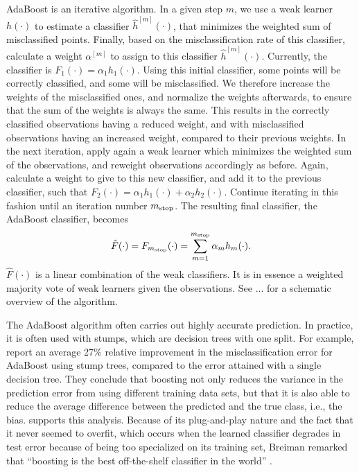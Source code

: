 AdaBoost is an iterative algorithm.
In a given step $m$, we use a weak learner $h(\cdot)$ to estimate a classifier $\hat{h}^{[m]}(\cdot)$, that minimizes the weighted sum of misclassified points.
Finally, based on the misclassification rate of this classifier, calculate a weight $\alpha^{[m]}$ to assign to this classifier $\hat{h}^{[m]}(\cdot)$.
Currently, the classifier is $F_1(\cdot)=\alpha_1h_1(\cdot)$.
Using this initial classifier, some points will be correctly classified, and some will be misclassified.
We therefore increase the weights of the misclassified ones, and normalize the weights afterwards, to ensure that the sum of the weights is always the same.
This results in the correctly classified observations having a reduced weight, and with misclassified observations having an increased weight, compared to their previous weights.
In the next iteration, apply again a weak learner which minimizes the weighted sum of the observations, and reweight observations accordingly as before.
Again, calculate a weight to give to this new classifier, and add it to the previous classifier, such that $F_2(\cdot)=\alpha_1h_1(\cdot)+\alpha_2h_2(\cdot)$.
Continue iterating in this fashion until an iteration number $m_{\text{stop}}$.
The resulting final classifier, the AdaBoost classifier, becomes
\begin{equation*}
    \hat{F}(\cdot)=F_{m_{\text{stop}}}(\cdot)=\sum_{m=1}^{m_{\text{stop}}}\alpha_mh_m(\cdot).
\end{equation*}
$\hat{F}(\cdot)$ is a linear combination of the weak classifiers.
It is in essence a weighted majority vote of weak learners given the observations.
See ... for a schematic overview of the algorithm.

The AdaBoost algorithm often carries out highly accurate prediction.
In practice, it is often used with stumps, which are decision trees with one split.
For example, \citet{bauer-kohavi} report an average 27\% relative improvement in the misclassification error for AdaBoost using stump trees, compared to the error attained with a single decision tree.
They conclude that boosting not only reduces the variance in the prediction error from using different training data sets, but that it is also able to reduce the average difference between the predicted and the true class, i.e., the bias.
\citet{breiman1998} supports this analysis.
Because of its plug-and-play nature and the fact that it never seemed to overfit, which occurs when the learned classifier degrades in test error because of being too specialized on its training set, Breiman remarked that ``boosting is the best off-the-shelf classifier in the world'' \citep{ESL}.

